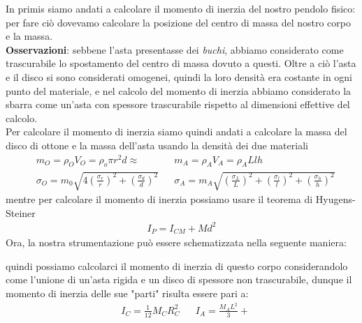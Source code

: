 \documentclass{article}
\begin{document}
In primis siamo andati a calcolare il momento di inerzia del nostro pendolo fisico: per fare ciò dovevamo calcolare la posizione del centro di massa del nostro corpo e la massa. \\
\textbf{Osservazioni}: sebbene l'asta presentasse dei \emph{buchi}, abbiamo considerato come trascurabile lo spostamento del centro di massa dovuto a questi. Oltre a ciò l'asta e il disco si sono considerati omogenei, quindi la loro densità era costante in ogni punto del materiale, e nel calcolo del momento di inerzia abbiamo considerato la sbarra come un'asta con spessore trascurabile rispetto al dimensioni effettive del calcolo. \\
Per calcolare il momento di inerzia siamo quindi andati a calcolare la massa del disco di ottone e la massa dell'asta usando la densità dei due materiali
\begin{align*}
	&m_O = \rho_O V_O = \rho_o \pi r^2 d \approx & &m_A = \rho_A V_A = \rho_A Llh \\
	&\sigma_O = m_0 \sqrt{4 \left(\frac{\sigma_r}{r} \right)^2 + \left( \frac{\sigma_d}{d} \right)^2}  & &\sigma_A = m_A \sqrt{ \left(\frac{\sigma_L}{L} \right)^2 + \left( \frac{\sigma_l}{l} \right)^2 + \left( \frac{\sigma_h}{h} \right)^2}
\end{align*}
mentre per calcolare il momento di inerzia possiamo usare il teorema di Hyugens-Steiner
\begin{align*}
	I_P = I_{CM} + Md^2
\end{align*}
Ora, la nostra strumentazione può essere schematizzata nella seguente maniera:
\begin{figure}[H]
		
\end{figure}
quindi possiamo calcolarci il momento di inerzia di questo corpo considerandolo come l'unione di un'asta rigida e un disco di spessore non trascurabile, dunque il momento di inerzia delle sue "parti" risulta essere pari a:
\begin{align*}
	&I_C = \frac{1}{12} M_C R^2_C & &I_A = \frac{M_A L^2}{3} + 
\end{align*}
\end{document}
